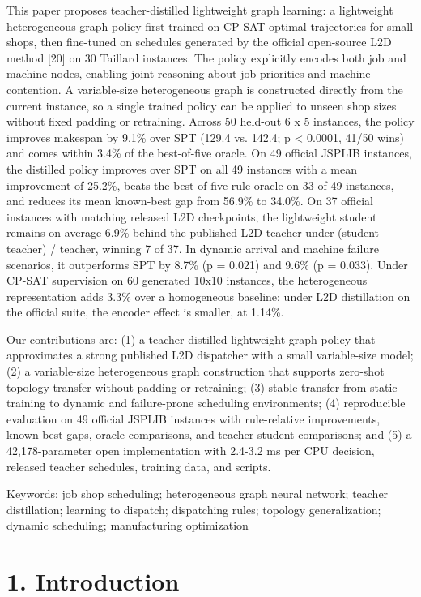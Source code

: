 \documentclass{article}
\begin{document}
This paper proposes teacher-distilled lightweight graph learning: a lightweight heterogeneous graph policy first trained on CP-SAT optimal trajectories for small shops, then fine-tuned on schedules generated by the official open-source L2D method {[}20{]} on 30 Taillard instances. The policy explicitly encodes both job and machine nodes, enabling joint reasoning about job priorities and machine contention. A variable-size heterogeneous graph is constructed directly from the current instance, so a single trained policy can be applied to unseen shop sizes without fixed padding or retraining. Across 50 held-out 6 x 5 instances, the policy improves makespan by 9.1\% over SPT (129.4 vs. 142.4; p < 0.0001, 41/50 wins) and comes within 3.4\% of the best-of-five oracle. On 49 official JSPLIB instances, the distilled policy improves over SPT on all 49 instances with a mean improvement of 25.2\%, beats the best-of-five rule oracle on 33 of 49 instances, and reduces its mean known-best gap from 56.9\% to 34.0\%. On 37 official instances with matching released L2D checkpoints, the lightweight student remains on average 6.9\% behind the published L2D teacher under (student - teacher) / teacher, winning 7 of 37. In dynamic arrival and machine failure scenarios, it outperforms SPT by 8.7\% (p = 0.021) and 9.6\% (p = 0.033). Under CP-SAT supervision on 60 generated 10x10 instances, the heterogeneous representation adds 3.3\% over a homogeneous baseline; under L2D distillation on the official suite, the encoder effect is smaller, at 1.14\%.

Our contributions are: (1) a teacher-distilled lightweight graph policy that approximates a strong published L2D dispatcher with a small variable-size model; (2) a variable-size heterogeneous graph construction that supports zero-shot topology transfer without padding or retraining; (3) stable transfer from static training to dynamic and failure-prone scheduling environments; (4) reproducible evaluation on 49 official JSPLIB instances with rule-relative improvements, known-best gaps, oracle comparisons, and teacher-student comparisons; and (5) a 42,178-parameter open implementation with 2.4-3.2 ms per CPU decision, released teacher schedules, training data, and scripts.

Keywords: job shop scheduling; heterogeneous graph neural network; teacher distillation; learning to dispatch; dispatching rules; topology generalization; dynamic scheduling; manufacturing optimization


\section*{1. Introduction}
\end{document}
